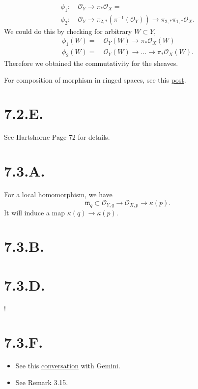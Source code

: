 \begin{enumerate}
    \begin{align}
    \phi_1:&~\mathscr O_Y\to \pi_{\ast}\mathscr O_X=\\
    \phi_2:&~\mathscr O_Y\to \pi_{2,\ast}(\pi^{-1}(\mathscr O_Y))\to \pi_{2,\ast}\pi_{1,\ast}\mathscr O_X.
    \end{align}
    We could do this by checking for arbitrary $W\subset Y$, 
    \begin{align}
        \phi_{1}(W)=&~\mathscr O_Y(W)\to \pi_{\ast}\mathscr O_X(W)\\
        \phi_{2}(W)=&~\mathscr O_Y(W)\to \ldots \to \pi_{\ast}\mathscr O_X(W).
    \end{align}
    Therefore we obtained the commutativity for the sheaves. 
\end{enumerate}

\begin{remark}
    For composition of morphism in ringed spaces, see this \href{https://math.stackexchange.com/questions/611497/does-hartshorne-really-not-define-things-like-the-composition-or-restriction-o}{post}.
\end{remark}

\section{7.2.E.}

See Hartshorne \cite{hartshorne2013algebraic} Page 72 for details.

\section{7.3.A.}

For a local homomorphism, we have 
\[\mathfrak m_{q}\subset \mathscr O_{Y,q}\to \mathscr O_{X,p}\to\kappa (p).\]It will induce a map $\kappa(q)\to\kappa(p)$.

\section{7.3.B.}

\section{7.3.D.}

!
\section{7.3.F.}

\begin{itemize}
    \item See this \href{https://gemini.google.com/share/11c266ac4484}{conversation} with Gemini. 
    \item See Remark 3.15.~\cite{gortz2020algebraic}
\end{itemize}


